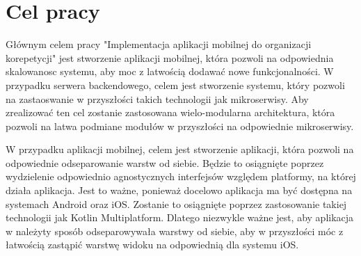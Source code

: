 \section*{Cel pracy}
Głównym celem pracy "Implementacja aplikacji mobilnej do organizacji korepetycji" jest stworzenie aplikacji mobilnej,
która pozwoli na odpowiednia skalowanosc systemu, aby moc z latwością dodawać nowe funkcjonalności.
W przypadku serwera backendowego, celem jest stworzenie systemu, który pozwoli na zastaoswanie w przyszłości takich technologii jak mikroserwisy.
Aby zrealizować ten cel zostanie zastosowana wielo-modularna architektura, która pozwoli na latwa podmiane modułów w przyszłości na odpowiednie mikroserwisy.

W przypadku aplikacji mobilnej, celem jest stworzenie aplikacji, która pozwoli na odpowiednie odseparowanie warstw od siebie.
Będzie to osiągnięte poprzez wydzielenie odpowiednio agnostycznych interfejsów względem platformy, na której działa aplikacja.
Jest to ważne, ponieważ docelowo aplikacja ma być dostępna na systemach Android oraz iOS. Zostanie to osiągnięte poprzez zastosowanie takiej technologii jak Kotlin Multiplatform.
Dlatego niezwykle ważne jest, aby aplikacja w należyty sposób odseparowywała warstwy od siebie, aby w przyszłości móc z łatwością zastąpić warstwę widoku na odpowiednią dla systemu iOS.
